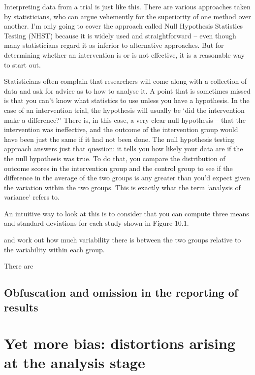 \documentclass[]{book}
\begin{document}
Interpreting data from a trial is just like this. There are various approaches taken by statisticians, who can argue vehemently for the superiority of one method over another. I'm only going to cover the approach called Null Hypothesis Statistics Testing (NHST) because it is widely used and straightforward -- even though many statisticians regard it as inferior to alternative approaches. But for determining whether an intervention is or is not effective, it is a reasonable way to start out.

Statisticians often complain that researchers will come along with a collection of data and ask for advice as to how to analyse it. A point that is sometimes missed is that you can't know what statistics to use unless you have a hypothesis. In the case of an intervention trial, the hypothesis will usually be `did the intervention make a difference?' There is, in this case, a very clear null hypothesis -- that the intervention was ineffective, and the outcome of the intervention group would have been just the same if it had not been done. The null hypothesis testing approach answers just that question: it tells you how likely your data are if the the null hypothesis was true. To do that, you compare the distribution of outcome scores in the intervention group and the control group to see if the difference in the average of the two groups is any greater than you'd expect given the variation within the two groups. This is exactly what the term `analysis of variance' refers to.

An intuitive way to look at this is to consider that you can compute three means and standard deviations for each study shown in Figure 10.1.

and work out how much variability there is between the two groups relative to the variability within each group.

There are

\hypertarget{obfuscation-and-omission-in-the-reporting-of-results}{%
\section{Obfuscation and omission in the reporting of results}\label{obfuscation-and-omission-in-the-reporting-of-results}}

\hypertarget{yet-more-bias-distortions-arising-at-the-analysis-stage}{%
\chapter{Yet more bias: distortions arising at the analysis stage}\label{yet-more-bias-distortions-arising-at-the-analysis-stage}}
\end{document}
